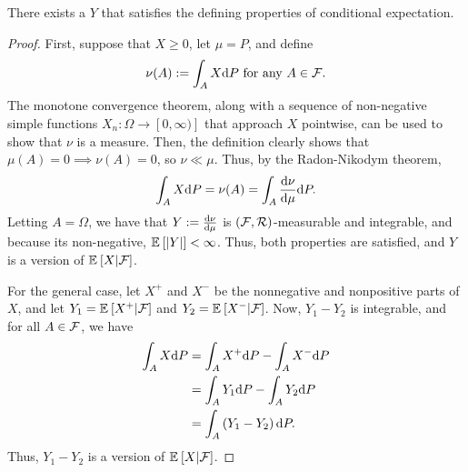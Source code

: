 \begin{lem}[Existence]
    There exists a $Y$ that satisfies the defining properties of conditional expectation.
\end{lem}
\begin{proof}
    First, suppose that $X \geq 0$, let $\mu = P$, and define
    \begin{align*}
        \nu(A) := \int_A X \text{d} P \text{ for any } A \in \mathcal{F}.
    \end{align*}
    The monotone convergence theorem, along with a sequence of non-negative simple functions $X_n: \Omega \rightarrow [0, \infty)]$ that approach $X$ pointwise, can be used to show that $\nu$ is a measure. Then, the definition clearly shows that $\mu(A) = 0 \implies \nu(A) = 0$, so $\nu \ll \mu$. Thus, by the Radon-Nikodym theorem,
    \begin{align*}
        \int_A X \text{d} P = \nu(A) = \int_A \frac{\text{d} \nu}{\text{d} \mu} \text{d} P.
    \end{align*}
    Letting $A = \Omega$, we have that $Y := \frac{\text{d} \nu}{\text{d} \mu}$ is $\left(\mathcal{F}, \mathcal{R}\right)$-measurable and integrable, and because its non-negative, ${\mathbb E}_{}\left[\left|Y\right|\right] < \infty$. Thus, both properties are satisfied, and $Y$ is a version of ${\mathbb E}_{}\left[X | \mathcal{F}\right]$. 

    For the general case, let $X^+$ and $X^-$ be the nonnegative and nonpositive parts of $X$, and let $Y_1 = {\mathbb E}_{}\left[X^+|\mathcal{F}\right]$ and $Y_2 = {\mathbb E}_{}\left[X^- | \mathcal{F}\right]$. Now, $Y_1 - Y_2$ is integrable, and for all $A \in \mathcal{F}$, we have
    \begin{align*}
        \int_A X \text{d} P &= \int_A X^+ \text{d} P - \int_A X^- \text{d} P\\
        &= \int_A Y_1 \text{d} P - \int_A Y_2 \text{d} P\\
        &= \int_A \left(Y_1 - Y_2\right) \text{d} P.
    \end{align*}
    Thus, $Y_1 - Y_2$ is a version of ${\mathbb E}_{}\left[X | \mathcal{F}\right]$.
\end{proof}

